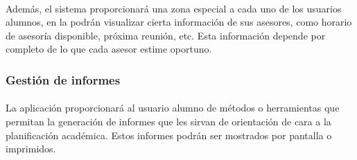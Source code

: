       \paragraph{}Además, el sistema proporcionará una zona especial
      a cada uno de los usuarios alumnos, en la podrán visualizar cierta
      información de sus asesores, como horario de asesoría disponible, próxima
      reunión, etc. Esta información depende por completo de lo que cada asesor
      estime oportuno.

      \subsubsection{Gestión de informes}

      \paragraph{}La aplicación proporcionará al usuario alumno de métodos o
      herramientas que permitan la generación de informes que les sirvan de
      orientación de cara a la planificación académica. Estos informes podrán
      ser mostrados por pantalla o imprimidos.